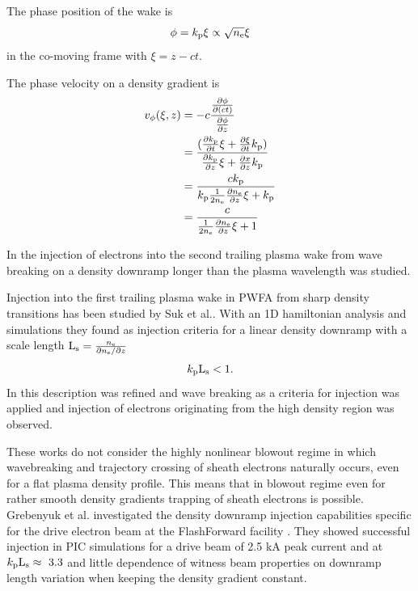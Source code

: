 The phase position of the wake is
\begin{equation}
\phi=k_\mathrm{p}\xi \propto \sqrt{n_\mathrm{e}}\xi
\end{equation}
in the co-moving frame with $\xi=z-ct$.

The phase velocity on a density gradient is 
\begin{align}
v_\phi(\xi,z)&=-c\frac{\frac{\partial \phi}{\partial (ct)}}{\frac{\partial \phi}{\partial z}}\\
&=\frac{(\frac{\partial k_\mathrm{p}}{\partial t}\xi+\frac{\partial \xi}{\partial t} k_\mathrm{p})}{\frac{\partial k_\mathrm{p}}{\partial z}\xi + \frac{\partial x}{\partial z}k_\mathrm{p}}\\
&=\frac{ck_\mathrm{p}}{k_\mathrm{p}\frac{1}{2n_\mathrm{e}}\frac{ \partial n_\mathrm{e}}{\partial z}\xi+k_\mathrm{p} }\\
&=\frac{c}{\frac{1}{2n_\mathrm{e}}\frac{ \partial n_\mathrm{e}}{\partial z}\xi+1 }
\end{align}



In \cite{BulanovPRE98WaveBreak} the injection of electrons into the second trailing plasma wake from wave breaking on a density downramp longer than the plasma wavelength was studied.

Injection into the first trailing plasma wake in PWFA from sharp density transitions has been studied by Suk et al.\cite{suk2001_PRL_DensityTransition}. With an 1D hamiltonian analysis and simulations they found as injection criteria for a linear density downramp with a scale length $\mathrm{L}_\mathrm{s} = \frac{n_\mathrm{e}}{\partial n_\mathrm{e} / \partial z}$
\begin{equation}
k_\mathrm{p} \mathrm{L}_\mathrm{s}<1.
\label{eqn:kpLs}
\end{equation}
In \cite{england2002PREDensityTransition} this description was refined and wave breaking as a criteria for injection was applied and injection of electrons originating from the high density region was observed.

These works do not consider the highly nonlinear blowout regime in which wavebreaking and trajectory crossing of sheath electrons naturally occurs, even for a flat plasma density profile.
This means that in blowout regime even for rather smooth density gradients trapping of sheath electrons is possible. Grebenyuk et al. investigated the density downramp injection capabilities specific for the drive electron beam at the FlashForward facility \cite{FlashForwardFacility2016}.
They showed successful injection in PIC simulations for a drive beam of 2.5 kA peak current and at $\kP\mathrm{L}_\mathrm{s}\approx\ 3.3$ \cite{grebenyuk2014DownRamp} and little dependence of witness beam properties on downramp length variation when keeping the density gradient constant. 

